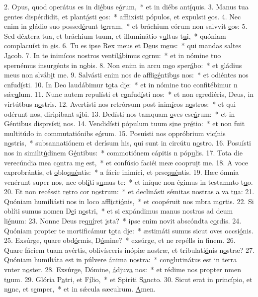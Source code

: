 2. Opus, quod operátus es in di\uline{é}bus e\uline{ó}rum,~* et in diébs ant\uline{í}quis.
3. Manus tua gentes dispérdidit, et plant\uline{á}sti \uline{e}os:~* afflixísti pópulos, et expulsti \uline{e}os.
4. Nec enim in gládio suo possed\uline{é}runt t\uline{e}rram,~* et bráchium eórum non salvvit \uline{e}os:
5. Sed déxtera tua, et bráchium tuum, et illuminátio v\uline{u}ltus t\uline{u}i,~* quóniam complacuíst in \uline{e}is.
6. Tu es ipse Rex meus et D\uline{e}us m\uline{e}us:~* qui mandas saltes J\uline{a}cob.
7. In te inimícos nostros ventil\uline{á}bimus c\uline{o}rnu:~* et in nómine tuo spernémus insurgénts in n\uline{o}bis.
8. Non enim in arcu m\uline{e}o sper\uline{á}bo:~* et gládius meus non slváb\uline{i}t me.
9. Salvásti enim nos de afflig\uline{é}ntib\uline{u}s nos:~* et odiéntes nos cnfud\uline{í}sti.
10. In Deo laudábimur t\uline{o}ta d\uline{i}e:~* et in nómine tuo confitébimur n sǽc\uline{u}lum.
11. Nunc autem repulísti et c\uline{o}nfud\uline{í}sti nos:~* et non egrediéris, Deus, in virtútbus n\uline{o}stris.
12. Avertísti nos retrórsum post inim\uline{í}cos n\uline{o}stros:~* et qui odérunt nos, diripibant s\uline{i}bi.
13. Dedísti nos tamquam \uline{o}ves esc\uline{á}rum:~* et in Géntibus disprsíst\uline{i} nos.
14. Vendidísti pópulum tuum s\uline{i}ne pr\uline{é}tio:~* et non fuit multitúdo in commutatiónibs e\uline{ó}rum.
15. Posuísti nos oppróbrium vic\uline{í}nis n\uline{o}stris,~* subsannatiónem et derísum his, qui sunt in circútu n\uline{o}stro.
16. Posuísti nos in similit\uline{ú}dinem G\uline{é}ntibus:~* commotiónem cápitis n póp\uline{u}lis.
17. Tota die verecúndia mea c\uline{o}ntra m\uline{e} est,~* et confúsio faciéi meæ coopru\uline{i}t me.
18. A voce exprobrántis, et \uline{o}blo\uline{qué}ntis:~* a fácie inimíci, et prse\uline{qué}ntis.
19. Hæc ómnia venérunt super nos, nec obl\uline{í}ti s\uline{u}mus te:~* et iníque non égimus in testamnto t\uline{u}o.
20. Et non recéssit r\uline{e}tro cor n\uline{o}strum:~* et declinásti sémitas nostras a va t\uline{u}a:
21. Quóniam humiliásti nos in loco affl\uline{i}cti\uline{ó}nis,~* et coopéruit nos mbra m\uline{o}rtis.
22. Si oblíti sumus nomen D\uline{e}i n\uline{o}stri,~* et si expándimus manus nostras ad deum li\uline{é}num:
23. Nonne Deus re\uline{quí}ret \uline{i}sta?~* ipse enim novit abscóndta c\uline{o}rdis.
24. Quóniam propter te mortificámur t\uline{o}ta d\uline{i}e:~* æstimáti sumus sicut oves occsi\uline{ó}nis.
25. Exsúrge, quare obd\uline{ó}rmis, D\uline{ó}mine?~* exsúrge, et ne repélls in f\uline{i}nem.
26. Quare fáciem tuam avértis, oblivísceris inópiæ nostræ, et tribulati\uline{ó}nis n\uline{o}stræ?
27. Quóniam humiliáta est in púlvere \uline{á}nima n\uline{o}stra:~* conglutinátus est in terra vnter n\uline{o}ster.
28. Exsúrge, Dómine, \uline{á}djuv\uline{a} nos:~* et rédime nos propter nmen t\uline{u}um.
29. Glória P\uline{a}tri, et F\uline{í}lio,~* et Spiríti S\uline{a}ncto.
30. Sicut erat in princípio, et n\uline{u}nc, et s\uline{e}mper,~* et in sǽcula sæculrum. \uline{A}men.
